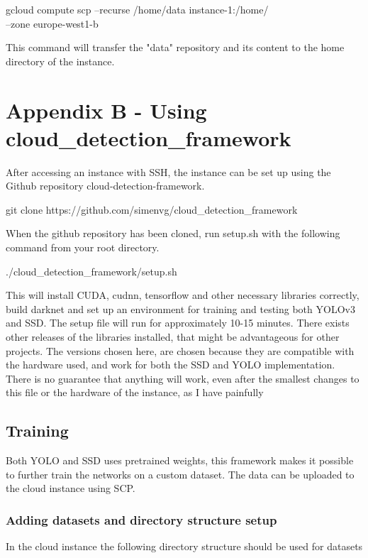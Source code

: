 \begin{lcverbatim}
gcloud compute scp --recurse /home/data instance-1:/home/ \\ 
--zone europe-west1-b
\end{lcverbatim}
\vspace{3mm}

This command will transfer the "data" repository and its content to the home directory of the instance.




\chapter{Appendix B - Using cloud\_detection\_framework}
After accessing an instance with SSH, the instance can be set up using the Github repository cloud-detection-framework. 

\begin{lcverbatim}
git clone https://github.com/simenvg/cloud\_detection\_framework
\end{lcverbatim}

When the github repository has been cloned, run setup.sh with the following command from your root directory.

\begin{lcverbatim}
./cloud\_detection\_framework/setup.sh
\end{lcverbatim}

This will install CUDA, cudnn, tensorflow and other necessary libraries correctly, build darknet and set up an environment for training and testing both YOLOv3 and SSD. The setup file will run for approximately 10-15 minutes. There exists other releases of the libraries installed, that might be advantageous for other projects. The versions chosen here, are chosen because they are compatible with the hardware used, and work for both the SSD and YOLO implementation. There is no guarantee that anything will work, even after the smallest changes to this file or the hardware of the instance, as I have painfully 

\section{Training}
Both YOLO and SSD uses pretrained weights, this framework makes it possible to further train the networks on a custom dataset. The data can be uploaded to the cloud instance using SCP. 
\newpage
\subsection{Adding datasets and directory structure setup}
In the cloud instance the following directory structure should be used for datasets


